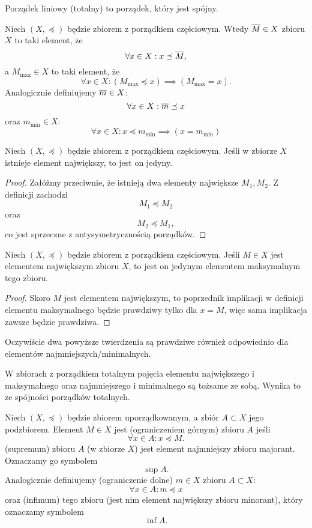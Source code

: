 \begin{definition}
    Porządek liniowy (totalny) to porządek, który jest spójny.
\end{definition}

Niech $(X, \preceq)$ będzie zbiorem z porządkiem częściowym. Wtedy  $\overline{M} \in X$ zbioru $X$ to taki element, że
\[ \forall x \in X : x \preceq \overline{M}, \]
a  $M_{\max} \in X$ to taki element, że
\[ \forall x \in X : (M_{\max} \preceq x) \implies (M_{\max} = x). \]
Analogicznie definiujemy  $\overline{m} \in X$:
\[ \forall x \in X : \overline{m} \preceq x \]
oraz  $m_{\min} \in X$:
\[ \forall x \in X : x \preceq m_{\min} \implies (x = m_{\min}) \]

\begin{theorem}
    \label{t:uniq_greatest}
    Niech $(X, \preceq)$ będzie zbiorem z porządkiem częściowym. Jeśli w zbiorze $X$ istnieje element największy, to jest on jedyny.
\end{theorem}
\begin{proof}
    Załóżmy przeciwnie, że istnieją dwa elementy największe $M_1, M_2$. Z definicji zachodzi
    \[ M_1 \preceq M_2 \]
    oraz
    \[ M_2 \preceq M_1, \]
    co jest sprzeczne z antysymetrycznością porządków.
\end{proof}

\begin{theorem}
    Niech $(X, \preceq)$ będzie zbiorem z porządkiem częściowym. Jeśli $M \in X$ jest elementem największym zbioru $X$, to jest on jedynym elementem maksymalnym tego zbioru.
\end{theorem}
\begin{proof}
    Skoro $M$ jest elementem największym, to poprzednik implikacji w definicji elementu maksymalnego będzie prawdziwy tylko dla $x = M$, więc sama implikacja zawsze będzie prawdziwa.
\end{proof}

Oczywiście dwa powyższe twierdzenia są prawdziwe również odpowiednio dla elementów najmniejszych/minimalnych.

\begin{fact}
    \label{f:greatest=maximal}
    W zbiorach z porządkiem totalnym pojęcia elementu największego i maksymalnego oraz najmniejszego i minimalnego są tożsame ze sobą. Wynika to ze spójności porządków totalnych.
\end{fact}

Niech $(X, \preceq)$ będzie zbiorem uporządkowanym, a zbiór $A \subset X$ jego podzbiorem. Element $M \in X$ jest  (ograniczeniem górnym) zbioru $A$ jeśli
\[ \forall x \in A : x \preceq M. \]
 (supremum) zbioru $A$ (w zbiorze $X$) jest element najmniejszy zbioru majorant. Oznaczamy go symbolem
$$\sup A.$$
Analogicznie definiujemy  (ograniczenie dolne) $m \in X$ zbioru $A \subset X$:
\[ \forall x \in A : m \preceq x \]
oraz  (infimum) tego zbioru (jest nim element największy zbioru minorant), który oznaczamy symbolem
$$\inf A.$$

